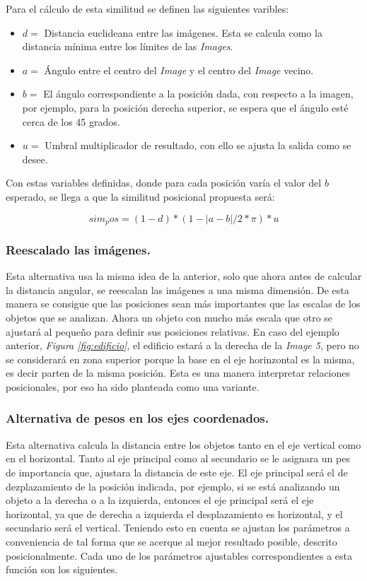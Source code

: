 Para el c\'alculo de esta similitud se definen las siguientes varibles:
\begin{itemize}
    \item $d =$ Distancia euclideana entre las im\'agenes. Esta se calcula como la distancia m\'inima entre los l\'imites de las \textit{Images}.

    \item $a =$ \'Angulo entre el centro del \textit{Image} y  el centro del \textit{Image} vecino.

    \item $b =$  El ángulo correspondiente a la posición dada, con respecto a la imagen, por ejemplo, para la posición derecha superior, se espera que el ángulo esté cerca de los 45 grados.

    \item $u =$  Umbral multiplicador de resultado, con ello se ajusta la salida como se desee.
\end{itemize}
Con estas variables definidas, donde para cada posici\'on var\'ia el valor del $b$ esperado, se llega a que la similitud posicional propuesta ser\'a:

\[sim_pos = (1-d)*(1- |a-b|/2*\pi) * u \]

\subsubsection{Reescalado las imágenes.}

Esta alternativa usa la misma idea de la anterior, solo que ahora antes de calcular la distancia angular, se reescalan las imágenes a una misma dimensión. De esta manera se consigue que las posiciones sean más importantes que las escalas de los objetos que se analizan. Ahora un objeto con mucho más escala que otro se ajustará al pequeño para definir sus posiciones relativas. En caso del ejemplo anterior, \textit{Figura \ref{fig:edificio}}, el edificio estar\'a a la derecha de la \textit{Image 5}, pero no se considerar\'a en zona superior porque la base en el eje horinzontal es la misma, es decir parten de la misma posici\'on. Esta es una manera interpretar relaciones posicionales, por eso ha sido planteada como una variante.

\subsubsection{Alternativa de pesos en los ejes coordenados.}

Esta alternativa calcula la distancia entre los objetos tanto en el eje vertical como en el horizontal. Tanto al eje principal como al secundario se le asignara un pes de importancia que, ajustara la distancia de este eje. El eje principal ser\'a el de dezplazamiento de la posici\'on indicada, por ejemplo, si se está analizando un objeto a la derecha o a la izquierda, entonces el eje principal será el eje horizontal, ya que de derecha a izquierda el desplazamiento es horizontal, y el secundario será el vertical. Teniendo esto en cuenta se ajustan los parámetros a conveniencia de tal forma que se acerque al mejor resultado posible, descrito posicionalmente. Cada uno de los parámetros ajustables correspondientes a esta función son los siguientes.

